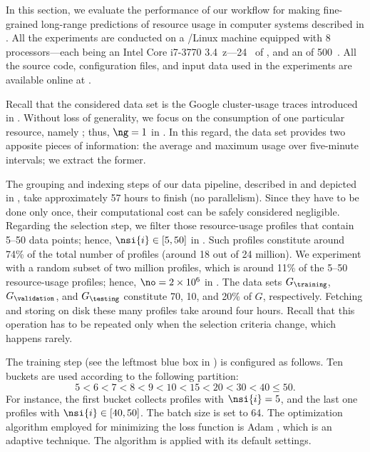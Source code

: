 In this section, we evaluate the performance of our workflow for making
fine-grained long-range predictions of resource usage in computer systems
described in . All the experiments are conducted on a
/Linux machine equipped with 8 processors---each being an Intel Core
i7-3770 3.4~z---24~ of , and an  of 500~.
All the source code, configuration files, and input data used in the experiments
are available online at \cite{eslab2017b}.


Recall that the considered data set is the Google cluster-usage traces
\cite{reiss2011} introduced in . Without loss of
generality, we focus on the consumption of one particular resource, namely
; thus, $\ng = 1$ in . In this regard, the data set
provides two apposite pieces of information: the average and maximum 
usage over five-minute intervals; we extract the former.

The grouping and indexing steps of our data pipeline, described in
 and depicted in , take
approximately 57 hours to finish (no parallelism). Since they have to be done
only once, their computational cost can be safely considered negligible.
Regarding the selection step, we filter those resource-usage profiles that
contain 5--50 data points; hence, $\nsi{i} \in [5, 50]$ in .
Such profiles constitute around 74\% of the total number of profiles (around 18
out of 24 million). We experiment with a random subset of two million profiles,
which is around 11\% of the 5--50 resource-usage profiles; hence, $\no = 2
\times 10^6$ in . The data sets $G_\training$,
$G_\validation$, and $G_\testing$ constitute 70, 10, and 20\% of $G$,
respectively. Fetching and storing on disk these many profiles take around four
hours. Recall that this operation has to be repeated only when the selection
criteria change, which happens rarely.


The training step (see the leftmost blue box in ) is
configured as follows. Ten buckets are used according to the following
partition:
\[
  5 < 6 < 7 < 8 < 9 < 10 < 15 < 20 < 30 < 40 \leq 50.
\]
For instance, the first bucket collects profiles with $\nsi{i} = 5$, and the
last one profiles with $\nsi{i} \in [40, 50]$. The batch size \nb is set to 64.
The optimization algorithm employed for minimizing the loss function is Adam
\cite{kingma2014}, which is an adaptive technique. The algorithm is applied with
its default settings.

